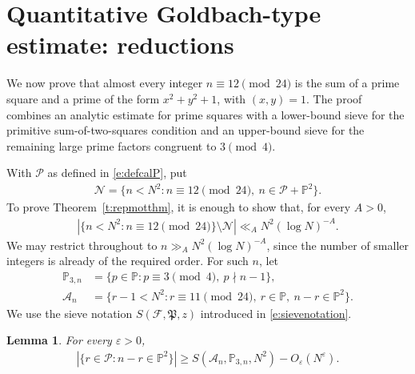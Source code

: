 \documentclass[12pt,reqno]{amsart}
\numberwithin{equation}{section}
\newtheorem{lemma}[equation]{Lemma}
\theoremstyle{definition}
\theoremstyle{remark}
\begin{document}
\section{Quantitative Goldbach-type estimate: reductions}
\label{s:reductionsGB}


We now prove that almost every integer $n\equiv12\pmod{24}$ is the sum
of a prime square and a prime of the form $x^2+y^2+1$, with $(x,y)=1$.
The proof combines an analytic estimate for prime squares with a
lower-bound sieve for the primitive sum-of-two-squares condition and an
upper-bound sieve for the remaining large prime factors congruent to
$3\pmod4$. 



With \(\mathcal P\) as defined in \eqref{e:defcalP}, put
\begin{align*}
 \mathcal N
 =\{n<N^2:n\equiv12\pmod{24},\
 n\in\mathcal P+\mathbb P^2\}.
\end{align*}
To prove Theorem~\ref{t:repmotthm}, it is enough to show that, for every
\(A>0\),
\begin{align}\label{e:exceptionalgoal}
 |\{n<N^2:n\equiv12\pmod{24}\}\setminus\mathcal N|
 \ll_A N^2(\log N)^{-A}.
\end{align}
We may restrict throughout to
\(n\gg_A N^2(\log N)^{-A}\), since the number of smaller integers is
already of the required order.
For such \(n\), let
\begin{align}
 \mathbb P_{3,n}
 &=\{p\in\mathbb P:p\equiv3\pmod4,\ p\nmid n-1\},
 \label{e:seta}\\
 \mathcal A_n
 &=\{r-1<N^2:r\equiv11\pmod{24},\ r\in\mathbb P,\
 n-r\in\mathbb P^2\}.
 \label{e:seta2}
\end{align}
We use the sieve notation \(S(\mathcal F,\mathfrak P,z)\) introduced in
\eqref{e:sievenotation}.

\begin{lemma}\label{l:fromsiftedtop}
For every $\varepsilon>0$,
\begin{align}\label{e:fromsiftedtop}
 |\{r\in\mathcal P:n-r\in\mathbb P^2\}|
 \geq S(\mathcal A_n,\mathbb P_{3,n},N^2)-O_\varepsilon(N^\varepsilon).
\end{align}
\end{lemma}
\end{document}
